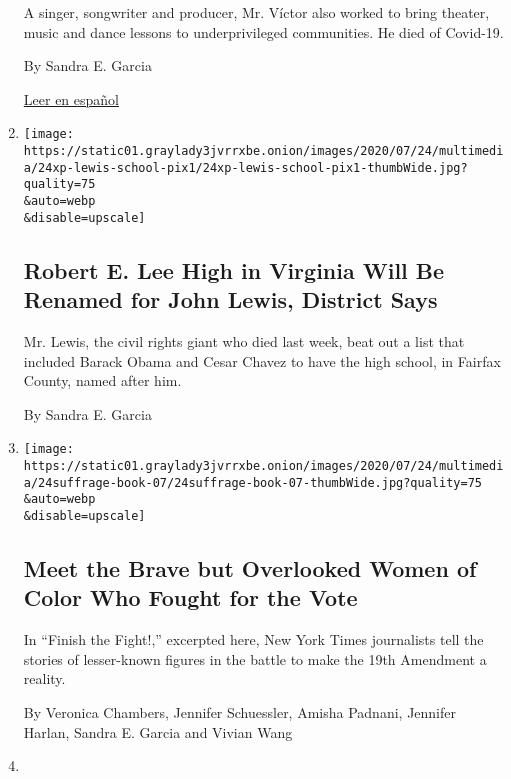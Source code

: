 \begin{enumerate}
  A singer, songwriter and producer, Mr. Víctor also worked to bring
  theater, music and dance lessons to underprivileged communities. He
  died of Covid-19.

  By Sandra E. Garcia

  \href{https://www.nytimes3xbfgragh.onion/es/2020/08/03/espanol/cultura/victor-victor-murio-coronavirus.html}{Leer
  en español}
\item
  \href{/2020/07/24/us/robert-e-lee-high-school-john-lewis.html}{}

  \texttt{[image: https://static01.graylady3jvrrxbe.onion/images/2020/07/24/multimedia/24xp-lewis-school-pix1/24xp-lewis-school-pix1-thumbWide.jpg?quality=75\\\&auto=webp\\\&disable=upscale]}

  \hypertarget{robert-e-lee-high-in-virginia-will-be-renamed-for-john-lewis-district-says}{%
  \subsection{Robert E. Lee High in Virginia Will Be Renamed for John
  Lewis, District
  Says}\label{robert-e-lee-high-in-virginia-will-be-renamed-for-john-lewis-district-says}}

  Mr. Lewis, the civil rights giant who died last week, beat out a list
  that included Barack Obama and Cesar Chavez to have the high school,
  in Fairfax County, named after him.

  By Sandra E. Garcia
\item
  \href{/2020/07/24/books/finish-the-fight-excerpt.html}{}

  \texttt{[image: https://static01.graylady3jvrrxbe.onion/images/2020/07/24/multimedia/24suffrage-book-07/24suffrage-book-07-thumbWide.jpg?quality=75\\\&auto=webp\\\&disable=upscale]}

  \hypertarget{meet-the-brave-but-overlooked-women-of-color-who-fought-for-the-vote}{%
  \subsection{Meet the Brave but Overlooked Women of Color Who Fought
  for the
  Vote}\label{meet-the-brave-but-overlooked-women-of-color-who-fought-for-the-vote}}

  In ``Finish the Fight!,'' excerpted here, New York Times journalists
  tell the stories of lesser-known figures in the battle to make the
  19th Amendment a reality.

  By Veronica Chambers, Jennifer Schuessler, Amisha Padnani, Jennifer
  Harlan, Sandra E. Garcia and Vivian Wang
\item
  \href{/2020/07/21/us/politics/john-lewis-comic-con.html}{}


\end{enumerate}
